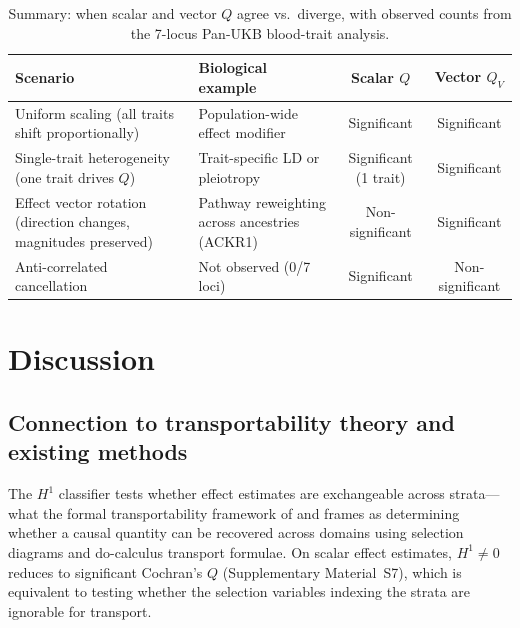 \documentclass[11pt]{article}
\begin{document}
\begin{table}[t]
\centering
\caption{Summary: when scalar and vector $Q$ agree vs.\ diverge, with observed counts from the 7-locus Pan-UKB blood-trait analysis.}
\label{tab:divergence-summary}
\small
\begin{tabular}{@{}p{3.5cm}p{3.5cm}cc@{}}
\toprule
\textbf{Scenario} & \textbf{Biological example} & \textbf{Scalar $Q$} & \textbf{Vector $Q_V$} \\
\midrule
Uniform scaling (all traits shift proportionally) & Population-wide effect modifier & Significant & Significant \\
Single-trait heterogeneity (one trait drives $Q$) & Trait-specific LD or pleiotropy & Significant (1 trait) & Significant \\
Effect vector rotation (direction changes, magnitudes preserved) & Pathway reweighting across ancestries (ACKR1) & Non-significant & Significant \\
Anti-correlated cancellation & Not observed (0/7 loci) & Significant & Non-significant \\
\bottomrule
\end{tabular}
\end{table}


\section{Discussion}
\label{sec:discussion}

\subsection{Connection to transportability theory and existing methods}

The $H^1$ classifier tests whether effect estimates are exchangeable across strata---what the formal transportability framework of \citet{bareinboim2016causal} and \citet{pearl2014external} frames as determining whether a causal quantity can be recovered across domains using selection diagrams and do-calculus transport formulae.
On scalar effect estimates, $H^1 \neq 0$ reduces to significant Cochran's $Q$ \citep{cochran1954combination} (Supplementary Material~S7), which is equivalent to testing whether the selection variables indexing the strata are ignorable for transport.
\end{document}

